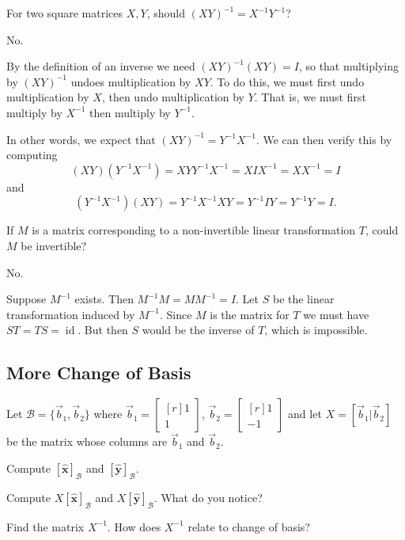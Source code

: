 \documentclass{problemset}
\DeclareMathOperator{\Id}{id}
\newcommand{\xhat}{{\hat {\mathbf x}}}
\newcommand{\yhat}{{\hat {\mathbf y}}}
\newcommand{\mat}[1]{\begin{bmatrix*}[r]#1\end{bmatrix*}}
\begin{document}
	\question
	\begin{parts}
		\item For two square matrices $X,Y$, should $(XY)^{-1}=X^{-1}Y^{-1}$?
			\begin{solution}
				No. 

				By the definition of an inverse we need $(XY)^{-1}(XY)=I$, so
				that multiplying by $(XY)^{-1}$ undoes multiplication
				by $XY$. To do this, we must first undo multiplication by $X$,
				then undo multiplication by $Y$. That is, we must first multiply
				by $X^{-1}$ then multiply by $Y^{-1}$.

				In other words, we expect that $(XY)^{-1} = Y^{-1}X^{-1}$. We can
				then verify this by computing
				\[
					(XY)(Y^{-1}X^{-1}) = XYY^{-1}X^{-1} = XIX^{-1} = XX^{-1} = I
				\]
				and
				\[
					(Y^{-1}X^{-1})(XY) = Y^{-1}X^{-1}XY = Y^{-1}IY = Y^{-1}Y = I.
				\]
			\end{solution}
		\item If $M$ is a matrix corresponding to a non-invertible linear transformation $T$,
			could $M$ be invertible?
			\begin{solution}
				No. 

				Suppose $M^{-1}$ exists. Then $M^{-1}M=MM^{-1}=I$. 
				Let $S$ be the linear transformation induced by $M^{-1}$. 
				Since $M$ is the matrix for $T$ we must have $ST=TS=\Id$. But 
				then $S$ would be the inverse of $T$, which is impossible.
			\end{solution}
	\end{parts}

\subsection*{More Change of Basis}
	\question
	Let $\mathcal B=\{\vec b_1,\vec b_2\}$ where $\vec b_1=\mat{1\\1}$, $\vec b_2=\mat{1\\-1}$
	and let $X=[\vec b_1|\vec b_2]$ be the matrix whose columns are $\vec b_1$ and $\vec b_2$.
	\begin{parts}
		\item Compute $[\xhat]_{\mathcal B}$ and $[\yhat]_{\mathcal B}$.
		\item Compute $X[\xhat]_{\mathcal B}$ and $X[\yhat]_{\mathcal B}$.  
			What do you notice?
		\item Find the matrix $X^{-1}$. How does $X^{-1}$ relate to change of basis?
	\end{parts}
\end{document}
